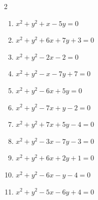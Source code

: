 \begin{multicols}{2}
\begin{enumerate}
  \item $x^{2}+y^{2}+x-5y=0$


  \item $x^{2}+y^{2}+6x+7y+3=0$


  \item $x^{2}+y^{2}-2x-2=0$


  \item $x^{2}+y^{2}-x-7y+7=0$


  \item $x^{2}+y^{2}-6x+5y=0$


  \item $x^{2}+y^{2}-7x+y-2=0$


  \item $x^{2}+y^{2}+7x+5y-4=0$


  \item $x^{2}+y^{2}-3x-7y-3=0$


  \item $x^{2}+y^{2}+6x+2y+1=0$

        \phantom{$\displaystyle 中心\: \left(-3,-1\right), \quad 半径 \ 3$}

  \item $x^{2}+y^{2}-6x-y-4=0$


  \item $x^{2}+y^{2}-5x-6y+4=0$


\end{enumerate}
\end{multicols}
